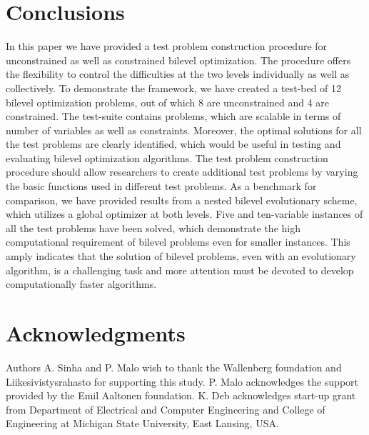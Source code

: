 \documentclass[twoside]{article}
\begin{document}
\section{Conclusions}
In this paper we have provided a test problem construction procedure for unconstrained as well as constrained bilevel optimization. The procedure offers the flexibility to control the difficulties at the two levels individually as well as collectively. To demonstrate the framework, we have created a test-bed of 12 bilevel optimization problems, out of which 8 are unconstrained and 4 are constrained. The test-suite contains problems, which are scalable in terms of number of variables as well as constraints. Moreover, the optimal solutions for all the test problems are clearly identified, which would be useful in testing and evaluating bilevel optimization algorithms. The test problem construction procedure should allow researchers to create additional test problems by varying the basic functions used in different test problems. As a benchmark for comparison, we have provided results from a nested bilevel evolutionary scheme, which utilizes a global optimizer at both levels. Five and ten-variable instances of all the test problems have been solved, which demonstrate the high computational requirement of bilevel problems even for smaller instances. This amply indicates that the solution of bilevel problems, even with an evolutionary algorithm, is a challenging task and more attention must be devoted to develop computationally faster algorithms.

\section*{Acknowledgments}
Authors A. Sinha and P. Malo wish to thank the Wallenberg foundation and Liikesivistysrahasto for supporting this study. P. Malo acknowledges the support provided by the Emil Aaltonen foundation. K. Deb acknowledges start-up grant from Department of Electrical and Computer Engineering and College of Engineering at Michigan State University, East Lansing, USA.

\small
\end{document}
